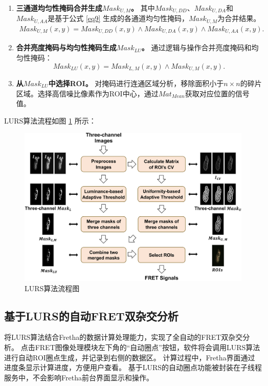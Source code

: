 \begin{enumerate}
\item \textbf{三通道均匀性掩码合并生成${Mask}_{U,M}$。}  
其中${Mask}_{U,DD}$、${Mask}_{U,DA}$和${Mask}_{U,AA}$是基于公式 \ref{eq9} 生成的各通道均匀性掩码，${Mask}_{U,M}$为合并结果。
\begin{equation}
    \begin{split}
    {Mask}_{U,M}(x,y)={Mask}_{U,DD}(x,y) \land {Mask}_{U,DA}(x,y) \land {Mask}_{U,AA}(x,y) .
    \end{split}
    \label{eq_merge_u}
\end{equation}
\item \textbf{合并亮度掩码与均匀性掩码生成${Mask}_{LU}$。}  
通过逻辑与操作合并亮度掩码和均匀性掩码：
\begin{equation}
    {Mask}_{LU}(x,y)={Mask}_{L,M}(x,y) \land {Mask}_{U,M}(x,y) .
    \label{eq10}
\end{equation}
\item \textbf{从${Mask}_{LU}$中选择ROI。}  
对掩码进行连通区域分析，移除面积小于$n \times n$的碎片区域。选择高信噪比像素作为ROI中心，通过${Mat}_{Mean}$获取对应位置的信号值。
\end{enumerate}

LURS算法流程如图 \ref{fig1} 所示：
\begin{figure}[!htbp]
\centering
\includegraphics[width=1\linewidth]{../figures/3/3_LURS流程图.png}
\caption{LURS算法流程图}\label{fig1}
\end{figure}

\subsection{基于LURS的自动FRET双杂交分析}
将LURS算法结合Fretha的数据计算处理能力，实现了全自动的FRET双杂交分析。
点击FRET图像处理模块左下角的“自动圈点”按钮，软件将会调用LURS算法进行自动ROI圈点生成，并记录到右侧的数据区。
计算过程中，Fretha界面通过进度条显示计算进度，方便用户查看。
基于LURS的自动圈点功能被封装在子线程服务中，不会影响Fretha前台界面显示和操作。


